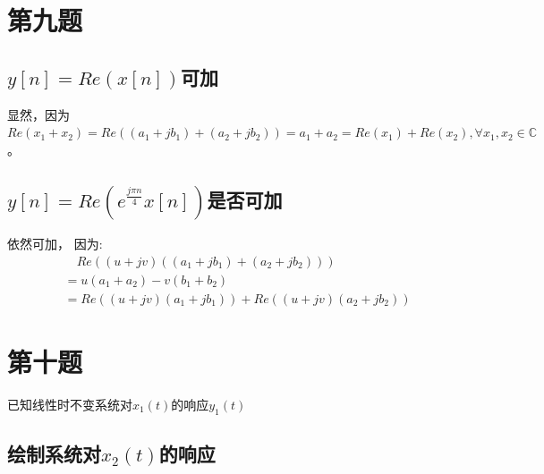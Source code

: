 \documentclass[UTF8, fontset=fandol,12pt, a4paper]{ctexart}
\begin{document}
\section* {第九题}

\subsection{$y[n] = Re(x[n])$可加}

显然，因为$Re(x_1 + x_2) = Re((a_1+jb_1) + (a_2+jb_2)) = a_1+a_2 = Re(x_1) + Re(x_2), \forall x_1, x_2 \in \mathbb{C}$。

\subsection{$y[n] = Re(e^{\frac{j\pi n}{4}}x[n])$是否可加}

依然可加， 因为:
\begin{align}
  & \quad Re((u + jv)((a_1+jb_1)+(a_2+jb_2))) \\
  & = u(a_1+a_2)-v(b_1+b_2) \\
  & = Re((u+jv)(a_1+jb_1)) + Re((u+jv)(a_2+jb_2))
\end{align}

\section* {第十题}

已知线性时不变系统对$x_1(t)$的响应$y_1(t)$

\subsection{绘制系统对$x_2(t)$的响应}

\begin{center}
\end{center}
\end{document}
